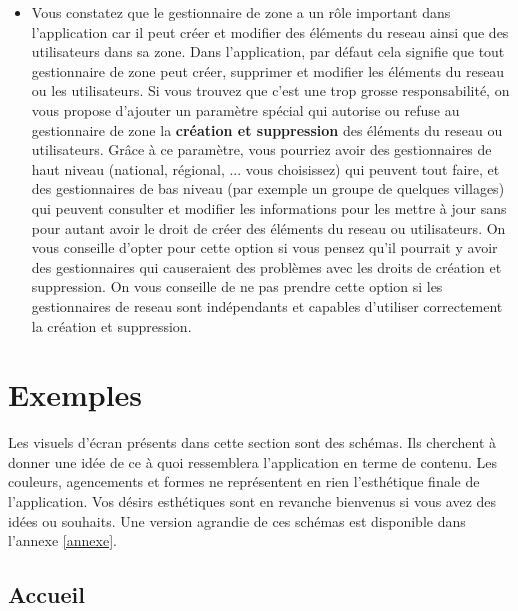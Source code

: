 \documentclass[a4paper, 11pt]{article}
\begin{document}
\begin{itemize}
    \item Vous constatez que le gestionnaire de \gls{zone} a un rôle important dans l'\gls{application} car il peut créer et modifier des éléments du \gls{reseau} ainsi que des \glspl{utilisateur} dans sa \gls{zone}. Dans l'\gls{application}, par défaut cela signifie que tout gestionnaire de \gls{zone} peut créer, supprimer et modifier les éléments du \gls{reseau} ou les \glspl{utilisateur}. Si vous trouvez que c'est une trop grosse responsabilité, on vous propose d'ajouter un paramètre spécial qui autorise ou refuse au gestionnaire de \gls{zone} la \textbf{création et suppression} des éléments du \gls{reseau} ou \glspl{utilisateur}. Grâce à ce paramètre, vous pourriez avoir des gestionnaires de haut niveau (national, régional, ... vous choisissez) qui peuvent tout faire, et des gestionnaires de bas niveau (par exemple un groupe de quelques villages) qui peuvent consulter et modifier les informations pour les mettre à jour sans pour autant avoir le droit de créer des éléments du \gls{reseau} ou \glspl{utilisateur}. On vous conseille d'opter pour cette option si vous pensez qu'il pourrait y avoir des gestionnaires qui causeraient des problèmes avec les droits de création et suppression. On vous conseille de ne pas prendre cette option si les gestionnaires de \gls{reseau} sont indépendants et capables d'utiliser correctement la création et suppression.
  \end{itemize}

\section{Exemples}
  \begin{shaded}
    Les visuels d'écran présents dans cette section sont des schémas. Ils cherchent à donner une idée de ce à quoi ressemblera l'\gls{application} en terme de contenu. Les couleurs, agencements et formes ne représentent en rien l'esthétique finale de l'\gls{application}. Vos désirs esthétiques sont en revanche bienvenus si vous avez des idées ou souhaits. Une version agrandie de ces schémas est disponible dans l'annexe \ref{annexe}.
  \end{shaded}

  \subsection{Accueil}
\end{document}
